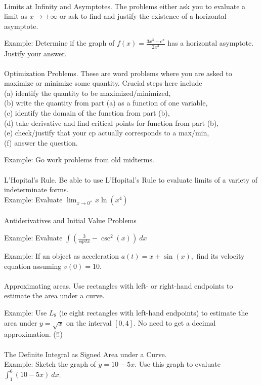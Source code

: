 \documentclass[11pt,fleqn]{article}
\begin{document}
\noindent {}\\
Limits at Infinity and Asymptotes. The problems either ask you to evaluate a limit as $x \to \pm \infty$ or ask to find and justify the existence of a  horizontal asymptote.

Example: Determine if the graph of $f(x)=\frac{3x^3-e^x}{2x^3}$ has a horizontal asymptote. Justify your answer.\\

\noindent {}\\
Optimization Problems. These are word problems where you are asked to maximize or minimize some quantity. Crucial steps here include\\
 (a) identify the quantity to be maximized/minimized, \\
 (b) write the quantity from part (a) as a function of one variable,\\
 (c) identify the domain of the function from part (b), \\
 (d) take derivative and find critical points for function from part (b), \\
 (e) check/justify that your cp actually corresponds to a max/min,\\
 (f) answer the question.
 
 Example: Go work problems from old midterms.\\ 

\noindent {}\\
L'Hopital's Rule. Be able to use L'Hopital's Rule to evaluate limits of a variety of indeterminate forms.\\

Example: Evaluate $\lim_{x \to 0^+} x \ln(x^4)$\\

\noindent {}\\
Antiderivatives and Initial Value Problems 

Example: Evaluate $\int (\frac{3}{sqrt{x}}-\csc^2(x)) \: dx$

Example: If an object as acceleration $a(t) = x + \sin(x),$ find its velocity equation assuming $v(0)=10.$\\


\noindent {}\\
Approximating areas. Use rectangles with left- or right-hand endpoints to estimate the area under a curve. 

Example: Use $L_8$ (ie eight rectangles with left-hand endpoints) to estimate the area under $y=\sqrt{x}$ on the interval $[0,4].$ No need to get a decimal approximation. (!!)\\


\noindent {}\\
The Definite Integral as Signed Area under a Curve.\\

Example: Sketch the graph of $y=10 - 5x.$ Use this graph to evaluate $\int_{1}^6 (10-5x) \:dx$.
\end{document}
